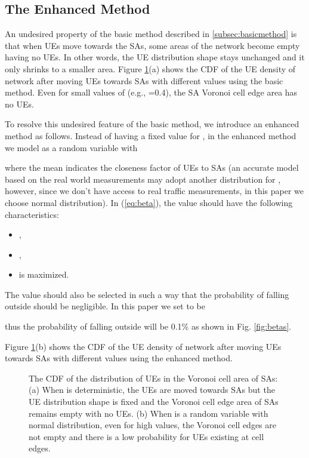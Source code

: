 \documentclass[journal]{IEEEtran}
\begin{document}
\subsection{The Enhanced Method}
\label{subsec:improvedmethod}

An undesired property of the basic method described in \ref{subsec:basicmethod} is that when UEs move towards the SAs, some areas of the network become empty having no UEs. In other words, the UE distribution shape stays unchanged and it only shrinks to a smaller area. Figure \ref{fig:cdfs}(a) shows the CDF of the UE density of network after moving UEs towards SAs with different  values using the basic method. Even for small values of  (e.g., =0.4), the SA Voronoi cell edge area has no UEs.

To resolve this undesired feature of the basic method, we introduce an enhanced method as follows. Instead of having a fixed value for , in the enhanced method we model  as a random variable with

where the mean  indicates the closeness factor of UEs to SAs (an accurate model based on the real world measurements may adopt another distribution for , however, since we don’t have access to real traffic measurements, in this paper we choose normal distribution). In (\ref{eq:beta}), the  value should have the following characteristics:
\begin{itemize}
\item ,
\item ,
\item  is maximized.
\end{itemize}

The  value should also be selected in such a way that the probability of  falling outside  should be negligible. In this paper we set  to be

thus the probability of  falling outside  will be 0.1\% as shown in Fig. \ref{fig:betas}.

Figure \ref{fig:cdfs}(b) shows the CDF of the UE density of network after moving UEs towards SAs with different  values using the enhanced method.

\begin{figure}
   \centering
   \hfill
   \caption{The CDF of the distribution of UEs in the Voronoi cell area of SAs: (a) When  is deterministic, the UEs are moved towards SAs but the UE distribution shape is fixed and the Voronoi cell edge area of SAs remains empty with no UEs. (b) When  is a random variable with normal distribution, even for high  values, the Voronoi cell edges are not empty and there is a low probability for UEs existing at cell edges.}
   \label{fig:cdfs}
\end{figure}
\end{document}
